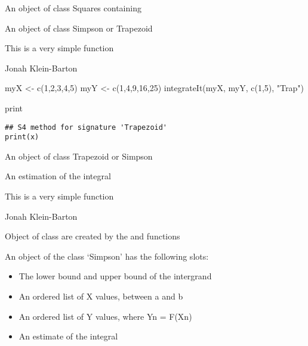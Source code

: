 \documentclass[a4paper]{book}
\begin{document}
%
\begin{Value}
An object of class Squares containing
\begin{ldescription}
\item[\code{object}] An object of class Simpson or Trapezoid
\end{ldescription}
\end{Value}
%
\begin{Note}\relax
This is a very simple function
\end{Note}
%
\begin{Author}\relax
Jonah Klein-Barton
\end{Author}
%
\begin{Examples}
\begin{ExampleCode}

myX <- c(1,2,3,4,5)
myY <- c(1,4,9,16,25)
integrateIt(myX, myY, c(1,5), "Trap")
\end{ExampleCode}
\end{Examples}
%
\begin{Description}\relax
print
\end{Description}
%
\begin{Usage}
\begin{verbatim}
## S4 method for signature 'Trapezoid'
print(x)
\end{verbatim}
\end{Usage}
%
\begin{Arguments}
\begin{ldescription}
\item[\code{x}] An object of class Trapezoid or Simpson
\end{ldescription}
\end{Arguments}
%
\begin{Value}
An estimation of the integral
\end{Value}
%
\begin{Note}\relax
This is a very simple function
\end{Note}
%
\begin{Author}\relax
Jonah Klein-Barton
\end{Author}
%
\begin{Description}\relax
Object of class  are created by the  and  functions
\end{Description}
%
\begin{Details}\relax
An object of the class `Simpson' has the following slots:
\begin{itemize}

\item {} The lower bound and upper bound of the intergrand
\item {} An ordered list of X values, between a and b
\item {} An ordered list of Y values, where Yn = F(Xn)
\item {} An estimate of the integral

\end{itemize}

\end{Details}
\end{document}
